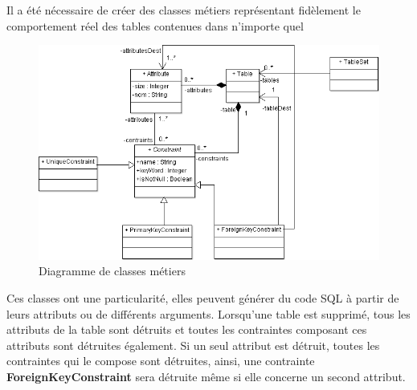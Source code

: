 Il a été nécessaire de créer des classes métiers représentant fidèlement le comportement réel des tables contenues dans n'importe quel \sgbd

\begin{figure}[H]
\includegraphics[width=15cm]{images/metier.png}
\caption{Diagramme de classes métiers}
\label{classes_metiers}
\end{figure}


Ces classes ont une particularité, elles peuvent générer du code SQL à partir de leurs attributs ou de différents arguments.
Lorsqu'une table est supprimé, tous les attributs de la table sont détruits et toutes les contraintes composant ces attributs sont détruites également.
Si un seul attribut est détruit, toutes les contraintes qui le compose sont détruites, ainsi, une contrainte \textbf{ForeignKeyConstraint} sera détruite même si elle concerne un second attribut.
